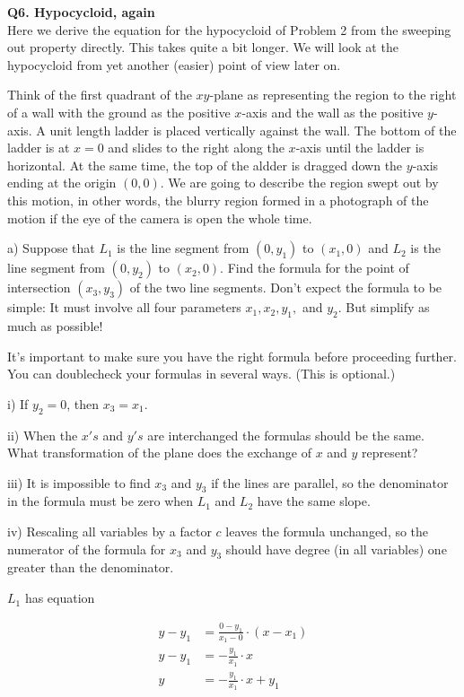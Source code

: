 \documentclass[9pt]{article}
\begin{document}
\begin{tcolorbox}
	\parskip10pt\relax
  \textbf{Q6. Hypocycloid, again} \\
  Here we derive the equation for the hypocycloid of Problem 2 from the sweeping out property directly. This takes quite a bit longer. We will look at the hypocycloid from yet another (easier) point of view later on.
  
  Think of the first quadrant of the $xy$-plane as representing the region to the right of a wall with the ground as the positive $x$-axis and the wall as the positive $y$-axis. A unit length ladder is placed vertically against the wall. The bottom of the ladder is at $x = 0$ and slides to the right along the $x$-axis until the ladder is horizontal. At the same time, the top of the aldder is dragged down the $y$-axis ending at the origin $(0, 0)$. We are going to describe the region swept out by this motion, in other words, the blurry region formed in a photograph of the motion if the eye of the camera is open the whole time.
  
  a) Suppose that $L_1$ is the line segment from $(0,y_1)$ to $(x_1,0)$ and $L_2$ is the line segment from $(0,y_2)$ to $(x_2,0)$. Find the formula for the point of intersection $(x_3,y_3)$ of the two line segments. Don't expect the formula to be simple: It must involve all four parameters $x_1, x_2, y_1,$ and $y_2$. But simplify as much as possible!
  
  It's important to make sure you have the right formula before proceeding further. You can doublecheck your formulas in several ways. (This is optional.)
  
  i) If $y_2 = 0$, then $x_3 = x_1$.
  
  ii) When the $x's$ and $y's$ are interchanged the formulas should be the same. What transformation of the plane does the exchange of $x$ and $y$ represent?
  
  iii) It is impossible to find $x_3$ and $y_3$ if the lines are parallel, so the denominator in the formula must be zero when $L_1$ and $L_2$ have the same slope.
  
  iv) Rescaling all variables by a factor $c$ leaves the formula unchanged, so the numerator of the formula for $x_3$ and $y_3$ should have degree (in all variables) one greater than the denominator.
\end{tcolorbox}

$L_1$ has equation

\begin{align*}
  y - y_1 &= \frac{0 - y_1}{x_1 - 0} \cdot (x - x_1) \\
  y - y_1 &= -\frac{y_1}{x_1} \cdot x \\
  y &= -\frac{y_1}{x_1} \cdot x + y_1
\end{align*}
\end{document}
